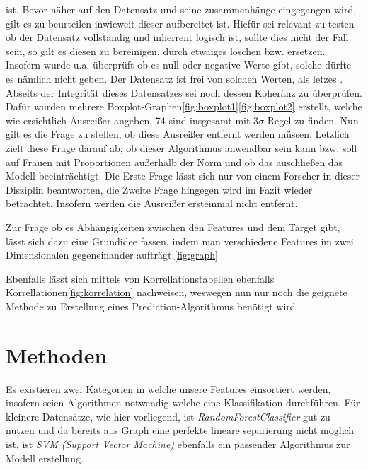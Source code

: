 \documentclass[a4paper,12pt]{article}
\begin{document}
ist.\newline
Bevor näher auf den Datensatz und seine zusammenhänge eingegangen wird, gilt es zu beurteilen inwieweit dieser aufbereitet ist.
Hiefür sei relevant zu testen ob der Datensatz vollständig und inherrent logisch ist, sollte dies nicht der Fall sein, so gilt
es diesen zu bereinigen, durch etwaiges löschen bzw. ersetzen.\newline
Insofern wurde u.a. überprüft ob es null oder negative Werte gibt, solche dürfte es nämlich nicht geben.
Der Datensatz ist frei von solchen Werten, als letzes .\newline
Abseits der Integrität dieses Datensatzes sei noch dessen Koheränz zu überprüfen.
Dafür wurden mehrere Boxplot-Graphen\ref{fig:boxplot1}\ref{fig:boxplot2} erstellt, welche wie ersichtlich Ausreißer angeben, 74 sind insgesamt mit
3$\sigma$ Regel zu finden. Nun gilt es die Frage zu stellen, ob diese Ausreißer entfernt werden müssen.\newline
Letzlich zielt diese Frage darauf ab, ob dieser Algorithmus anwendbar sein kann bzw. soll auf Frauen mit Proportionen außerhalb der Norm und
ob das auschließen das Modell beeinträchtigt. Die Erste Frage lässt sich nur von einem Forscher in dieser Disziplin beantworten,
die Zweite Frage hingegen wird im Fazit wieder betrachtet. Insofern werden die Ausreißer ersteinmal nicht entfernt.
\newline

Zur Frage ob es Abhängigkeiten zwischen den Features und dem Target gibt, lässt sich dazu eine Grundidee fassen, indem man verschiedene
Features im zwei Dimensionalen gegeneinander aufträgt.\ref{fig:graph}\newline


Ebenfalls lässt sich mittels von Korrellationstabellen ebenfalls Korrellationen\ref{fig:korrelation} nachweisen, weswegen nun nur noch die geignete Methode
zu Erstellung eines Prediction-Algorithmus benötigt wird.
\newline

\section{Methoden}
Es existieren zwei Kategorien in welche unsere Features einsortiert werden, insofern seien Algorithmen notwendig welche eine Klassifikation durchführen.
Für kleinere Datensätze, wie hier vorliegend, ist \textit{ RandomForestClassifier} gut zu nutzen und da bereits aus Graph
eine perfekte lineare separierung nicht möglich ist, ist \textit{SVM (Support Vector Machine)} ebenfalls ein passender Algorithmus zur Modell erstellung.
\end{document}

